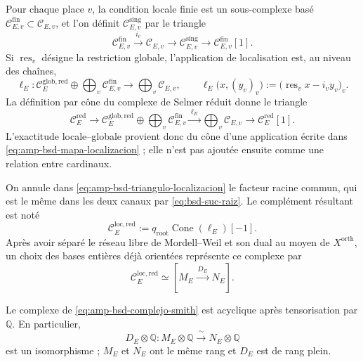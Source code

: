 Pour chaque place \(v\), la condition locale finie est un sous-complexe basé
\(\mathcal C_{E,v}^{\mathrm{fin}}\subset\mathcal C_{E,v}\), et l'on définit
\(\mathcal C_{E,v}^{\mathrm{sing}}\) par le triangle
\begin{equation}\label{eq:amp-bsd-triangulo-local}
 \mathcal C_{E,v}^{\mathrm{fin}}
 \xrightarrow{\ i_v\ }\mathcal C_{E,v}
 \longrightarrow\mathcal C_{E,v}^{\mathrm{sing}}
 \longrightarrow\mathcal C_{E,v}^{\mathrm{fin}}[1].
\end{equation}
Si \(\operatorname{res}_v\) désigne la restriction globale, l'application de
localisation est, au niveau des chaînes,
\begin{equation}\label{eq:amp-bsd-mapa-localizacion}
 \ell_E:
 \mathcal C_E^{\mathrm{glob,red}}\oplus
 \bigoplus_v\mathcal C_{E,v}^{\mathrm{fin}}
 \longrightarrow\bigoplus_v\mathcal C_{E,v},
 \qquad
 \ell_E\bigl(x,(y_v)_v\bigr)
 :=\bigl(\operatorname{res}_v x-i_vy_v\bigr)_v .
\end{equation}
La définition par cône du complexe de Selmer réduit donne le triangle
\begin{equation}\label{eq:amp-bsd-triangulo-localizacion}
 \mathcal C_E^{\mathrm{red}}
 \longrightarrow
 \mathcal C_E^{\mathrm{glob,red}}\oplus
 \bigoplus_v\mathcal C_{E,v}^{\mathrm{fin}}
 \xrightarrow{\ \ell_E\ }
 \bigoplus_v\mathcal C_{E,v}
 \longrightarrow\mathcal C_E^{\mathrm{red}}[1].
\end{equation}
L'exactitude locale--globale provient donc du cône d'une application écrite dans
\eqref{eq:amp-bsd-mapa-localizacion} ; elle n'est pas ajoutée ensuite comme une relation
entre cardinaux.

On annule dans \eqref{eq:amp-bsd-triangulo-localizacion} le facteur racine
commun, qui est le même dans les deux canaux par
\eqref{eq:bsd-suc-raiz}. Le complément résultant est noté
\begin{equation}\label{eq:amp-bsd-cono-local-reducido}
 \mathcal C_E^{\mathrm{loc,red}}
 :=q_{\mathrm{root}}\operatorname{Cone}(\ell_E)[-1].
\end{equation}
Après avoir séparé le réseau libre de Mordell--Weil et son dual au moyen de
\(X^{\mathrm{orth}}\), un choix des bases entières déjà orientées
représente ce complexe par
\begin{equation}\label{eq:amp-bsd-complejo-smith}
 \mathcal C_E^{\mathrm{loc,red}}
 \simeq[M_E\xrightarrow{\ D_E\ }N_E].
\end{equation}

\begin{lemma}
\label{lem:amp-bsd-aciclicidad-rango}
Le complexe de \eqref{eq:amp-bsd-complejo-smith} est acyclique après
tensorisation par \(\mathbb Q\). En particulier,
\[
 D_E\otimes\mathbb Q:M_E\otimes\mathbb Q
 \xrightarrow{\ \sim\ }N_E\otimes\mathbb Q
\]
est un isomorphisme ; \(M_E\) et \(N_E\) ont le même rang et \(D_E\) est
de rang plein.
\end{lemma}

